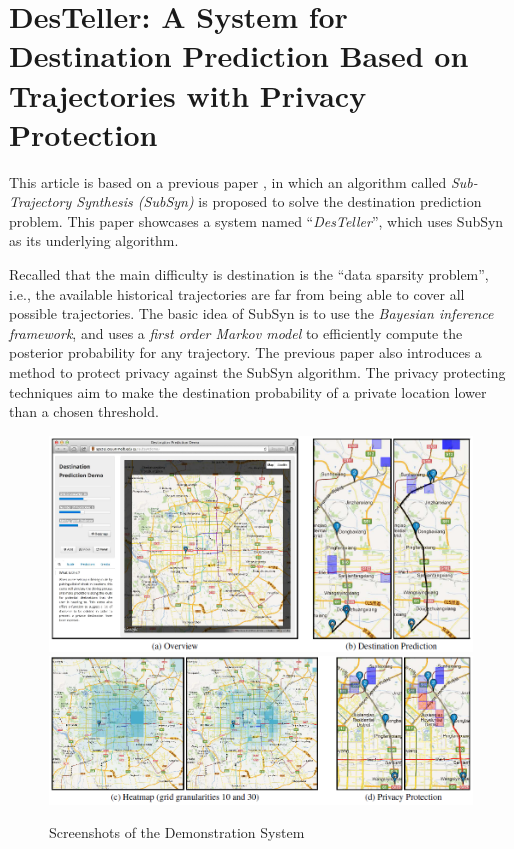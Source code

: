 \documentclass[paper=a4, fontsize=18pt]{article} %
\numberwithin{equation}{section} %
\numberwithin{figure}{section} %
\numberwithin{table}{section} %
\begin{document}
\section{DesTeller: {A} System for Destination Prediction Based on Trajectories with Privacy Protection \cite{XZZXYTJZ13}}

This article is based on a previous paper \cite{XZZXHX13}, in which an algorithm called \emph{Sub-Trajectory Synthesis (SubSyn)} is proposed to solve the destination prediction problem. This paper showcases a system named ``\emph{DesTeller}'', which uses SubSyn as its underlying algorithm.

Recalled that the main difficulty is destination is the ``data sparsity problem'', i.e., the available historical trajectories are far from being able to cover all possible trajectories. The basic idea of SubSyn is to use the \emph{Bayesian inference framework}, and uses a \emph{first order Markov model} to efficiently compute the posterior probability for any trajectory. The previous paper also introduces a method to protect privacy against the SubSyn algorithm. The privacy protecting techniques aim to make the destination probability of a private location lower than a chosen threshold.

\begin{figure}
  \centering
  \includegraphics[width=\linewidth]{9_5_desA.png}\\
  \includegraphics[width=\linewidth]{9_5_desB.png}\\
  \caption{Screenshots of the Demonstration System}\label{fig:des}
\end{figure}
\end{document}
